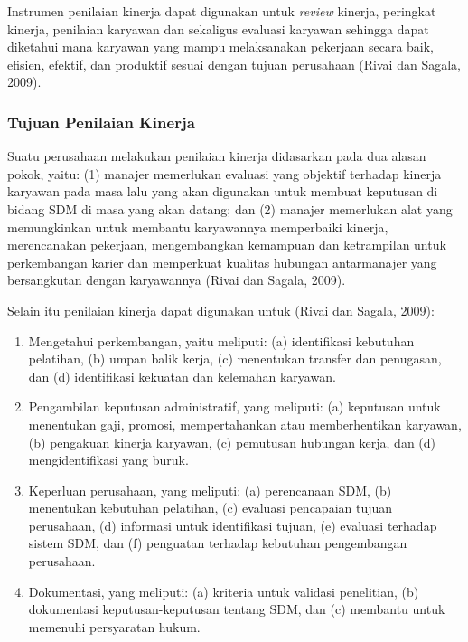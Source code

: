 Instrumen penilaian kinerja dapat digunakan untuk \emph{review} kinerja, peringkat kinerja, penilaian karyawan dan sekaligus evaluasi karyawan sehingga dapat diketahui mana karyawan yang mampu melaksanakan pekerjaan secara baik, efisien, efektif, dan produktif sesuai dengan tujuan perusahaan (Rivai dan Sagala, 2009).

    \subsubsection{Tujuan Penilaian Kinerja}
    Suatu perusahaan melakukan penilaian kinerja didasarkan pada dua alasan pokok, yaitu: (1) manajer memerlukan evaluasi yang objektif terhadap kinerja karyawan pada masa lalu yang akan digunakan untuk membuat keputusan di bidang SDM di masa yang akan datang; dan (2) manajer memerlukan alat yang memungkinkan untuk membantu karyawannya memperbaiki kinerja, merencanakan pekerjaan, mengembangkan kemampuan dan ketrampilan untuk perkembangan karier dan memperkuat kualitas hubungan antarmanajer yang bersangkutan dengan karyawannya (Rivai dan Sagala, 2009).
    
    Selain itu penilaian kinerja dapat digunakan untuk (Rivai dan Sagala, 2009):
    \begin{enumerate}
        \itemsep0em
        \item Mengetahui perkembangan, yaitu meliputi: (a) identifikasi kebutuhan pelatihan, (b) umpan balik kerja, (c) menentukan transfer dan penugasan, dan (d) identifikasi kekuatan dan kelemahan karyawan.
        \item Pengambilan keputusan administratif, yang meliputi: (a) keputusan untuk menentukan gaji, promosi, mempertahankan atau memberhentikan karyawan, (b) pengakuan kinerja karyawan, (c) pemutusan hubungan kerja, dan (d) mengidentifikasi yang buruk.
        \item Keperluan perusahaan, yang meliputi: (a) perencanaan SDM, (b) menentukan kebutuhan pelatihan, (c) evaluasi pencapaian tujuan perusahaan, (d) informasi untuk identifikasi tujuan, (e) evaluasi terhadap sistem SDM, dan (f) penguatan terhadap kebutuhan pengembangan perusahaan.
        \item Dokumentasi, yang meliputi: (a) kriteria untuk validasi penelitian, (b) dokumentasi keputusan-keputusan tentang SDM, dan (c) membantu untuk memenuhi persyaratan hukum.
    \end{enumerate}
    
